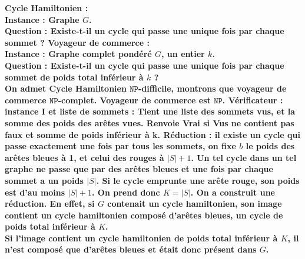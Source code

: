 \documentclass[french, 11pt]{article}
\newcommand*{\NP}{\texttt{NP}}
\begin{document}
\begin{ex}{}{}
    \bf{Cycle Hamiltonien} :\\
    Instance : Graphe $G$.\\
    Question : Existe-t-il un cycle qui passe une unique fois par chaque sommet ?\n
    \bf{Voyageur de commerce} :\\
    Instance : Graphe complet pondéré $G$, un entier $k$.\\
    Question : Existe-t-il un cycle qui passe une unique fois par chaque sommet de poids total inférieur à $k$ ?\\
    On admet Cycle Hamiltonien $\NP$-difficile, montrons que voyageur de commerce $\NP$-complet.
    \tcblower
    Voyageur de commerce est $\NP$. Vérificateur : instance I et liste de sommets :
    Tient une liste des sommets vus, et la somme des poids des arêtes vues. Renvoie Vrai si Vus ne contient pas faux et somme de poids inférieur à k.\n
    Réduction : il existe un cycle qui passe exactement une fois par tous les sommets, on fixe $b$ le poids des arêtes bleues à 1, et celui des rouges à $|S|+1$. Un tel cycle dans un tel graphe ne passe que par des arêtes bleues et une fois par chaque sommet a un poids $|S|$. Si le cycle emprunte une arête rouge, son poids est d'au moins $|S|+1$. On prend donc $K=|S|$. On a construit une réduction. En effet, si $G$ contenait un cycle hamiltonien, son image contient un cycle hamiltonien composé d'arêtes bleues, un cycle de poids total inférieur à $K$.\\
    Si l'image contient un cycle hamiltonien de poids total inférieur à $K$, il n'est composé que d'arêtes bleues et était donc présent dans $G$.
\end{ex}
\end{document}
